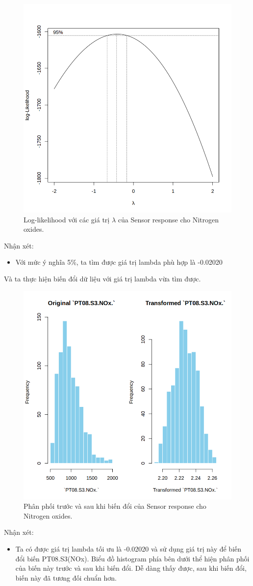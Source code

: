 \begin{figure}[H]
    \centering
    \includegraphics[width=0.75\columnwidth]{air_figures/PT08.S3(NOx)_optimal_lambda.png}
    \caption{Log-likelihood với các giá trị $\lambda$ của Sensor response cho Nitrogen oxides.}
    \label{fig:ptnox_optimal_lambda}
\end{figure}
Nhận xét:
\begin{itemize}
    \item Với mức ý nghĩa 5\%, ta tìm được giá trị lambda phù hợp là -0.02020
\end{itemize}

Và ta thực hiện biến đổi dữ liệu với giá trị lambda vừa tìm được.
\begin{figure}[H]
    \centering
    \includegraphics[width=0.75\columnwidth]{air_figures/PT08.S3(NOx)_transformed_distribution.png}
    \caption{Phân phối trước và sau khi biến đổi của Sensor response cho Nitrogen oxides.}
    \label{fig:ptnox_transformed_distribution}
\end{figure}
Nhận xét:
\begin{itemize}
    \item Ta có được giá trị lambda tối ưu là -0.02020 và sử dụng giá trị này để biến đổi biến PT08.S3(NOx). Biểu đồ histogram phía bên dưới thể hiện phân phối của biến này trước và sau khi biến đổi. Dễ dàng thấy được, sau khi biến đổi, biến này đã tương đối chuẩn hơn.
\end{itemize}

